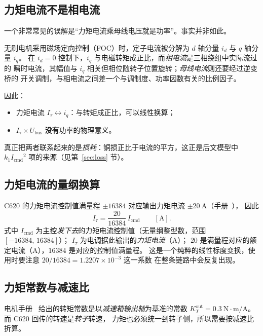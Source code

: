 \documentclass[cn,blue,11pt,device=normal]{elegantnote}
\newcommand{\Icmd}{I_{\mathrm{cmd}}{}}
\newcommand{\Itau}{I_{\tau}{}}
\begin{document}
\subsection{力矩电流不是相电流}

一个非常常见的误解是“力矩电流乘母线电压就是功率”。事实并非如此。

无刷电机采用磁场定向控制（FOC）时，定子电流被分解为 $d$ 轴分量 $i_d$ 与 $q$ 轴分量 $i_q$。
在 $i_d = 0$ 控制下，$i_q$ 与电磁转矩成正比，而\emph{相电流}是三相绕组中实际流过的
瞬时电流，其幅值与 $i_q$ 相关但相位随转子位置旋转；\emph{母线电流}则还要经过逆变桥的
开关调制，与相电流之间差一个与调制度、功率因数有关的比例因子。

因此：
\begin{itemize}
  \item 力矩电流 $\Itau \leftrightarrow i_q$：与转矩成正比，可以线性换算；
  \item $\Itau \times U_{\mathrm{bus}}$ \textbf{没有}功率的物理意义。
\end{itemize}

真正把两者联系起来的是\emph{损耗}：铜损正比于电流的平方，这正是后文模型中
$k_1\Icmd^2$ 项的来源（见第~\ref{sec:loss} 节）。

\subsection{力矩电流的量纲换算}

C620 的力矩电流控制值满量程 $\pm 16384$ 对应输出力矩电流 $\pm 20\ \mathrm{A}$（手册~\cite{c620manual}），
因此
\begin{equation}\label{eq:itau}
  \Itau = \frac{20}{16384}\,\Icmd \qquad [\mathrm{A}].
\end{equation}
式中 $\Icmd$ 为主控\emph{发下去}的力矩电流控制值（无量纲整型数，范围 $[-16384,\,16384]$）；
$\Itau$ 为电调据此输出的\emph{力矩电流}（A）；
$20$ 是满量程对应的额定电流（A），$16384$ 是对应的控制值满量程。
这是一个纯粹的线性标度变换，使用时要注意 $20/16384 = 1.2207\times 10^{-3}$ 这一系数
在整条链路中会反复出现。

\subsection{力矩常数与减速比}

电机手册~\cite{m3508manual} 给出的转矩常数是以\emph{减速箱输出轴}为基准的常数
$K_T^{\mathrm{out}} = 0.3\ \mathrm{N\cdot m/A}$。而 C620 回传的转速是\emph{转子}转速，
力矩也必须统一到转子侧，所以需要按减速比折算。
\end{document}
